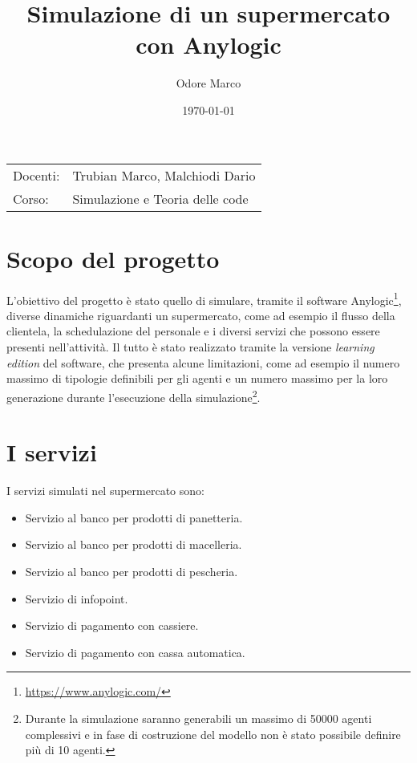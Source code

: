 \documentclass{article}
\title{Simulazione di un supermercato con Anylogic} %
\author{Odore Marco} %
\date{\today} %
\begin{document}
\maketitle %

\begin{center}
\begin{tabular}{l l}

Docenti: & Trubian Marco, Malchiodi Dario\\%
Corso: & Simulazione e Teoria delle code
\end{tabular}
\end{center}



\section{Scopo del progetto}

L'obiettivo del progetto è stato quello di simulare, tramite il software Anylogic\footnote{\url{https://www.anylogic.com/}}, diverse dinamiche riguardanti un supermercato, come ad esempio il flusso della clientela, la schedulazione del personale e i diversi servizi che possono essere presenti nell'attività.
\newline
\newline
Il tutto è stato realizzato tramite la versione \emph{learning edition} del software, che presenta alcune limitazioni, come ad esempio il numero massimo di tipologie definibili per gli agenti e un numero massimo per la loro generazione durante l'esecuzione della simulazione\footnote{Durante la simulazione saranno generabili un massimo di 50000 agenti complessivi e in fase di costruzione del modello non è stato possibile definire più di 10 agenti.}.

\section{I servizi}
I servizi simulati nel supermercato sono:
\begin{itemize}
\item Servizio al banco per prodotti di panetteria.
\item Servizio al banco per prodotti di macelleria.
\item Servizio al banco per prodotti di pescheria.
\item Servizio di infopoint.
\item Servizio di pagamento con cassiere.
\item Servizio di pagamento con cassa automatica.
\end{itemize} 
\end{document}

